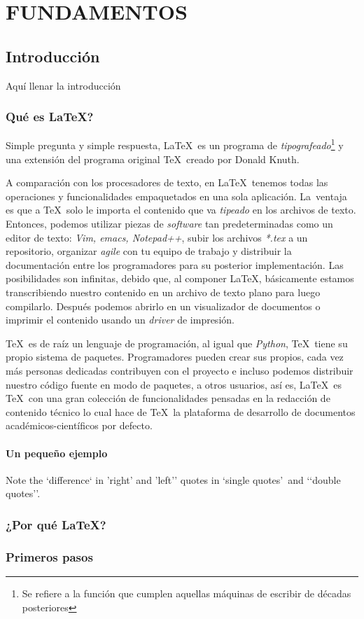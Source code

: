 \documentclass[11pt,a4paper]{book}
\begin{document}
    \tableofcontents

	\part[Fundamentos]{FUNDAMENTOS}

		\chapter{Introducción}\label{ch:intro}
			Aquí llenar la introducción
			\section{Qué es \LaTeX?}\label{sec:what-is-latex}
				\noindent Simple pregunta y simple respuesta, \LaTeX\ es un programa de \emph{tipografeado}\footnote{Se refiere a la función que cumplen aquellas máquinas de escribir de décadas posteriores} y una extensión del programa original \TeX\ creado por Donald Knuth.

				A comparación con los procesadores de texto, en \LaTeX\ tenemos todas las operaciones y funcionalidades empaquetados en una sola aplicación.
				\mbox{La ventaja} es que a \TeX\ solo le importa el contenido que va \emph{tipeado} en los archivos de texto.
				Entonces, podemos utilizar piezas de \emph{software} tan predeterminadas como un editor de texto: \emph{Vim, emacs, Notepad++}, subir los archivos \emph{*.tex} a un repositorio, organizar \emph{agile} con tu equipo de trabajo y distribuir la documentación entre los programadores para su posterior implementación.
				Las posibilidades son infinitas, debido que, al componer \LaTeX, básicamente estamos transcribiendo nuestro contenido en un archivo de texto plano para luego compilarlo.
				Después podemos abrirlo en un visualizador de documentos o imprimir el contenido usando un \emph{driver} de impresión.

				\TeX\ es de raíz un lenguaje de programación, al igual que \emph{Python}, \TeX\ tiene su propio sistema de paquetes.
				Programadores pueden crear sus propios, cada vez más personas dedicadas contribuyen con el proyecto e incluso podemos distribuir nuestro código fuente en modo de paquetes, a otros usuarios, así es, \LaTeX\ es \TeX\ con una gran colección de funcionalidades pensadas en la redacción de contenido técnico lo cual hace de \TeX\ la plataforma de desarrollo de documentos académicos-científicos por defecto.

				\subsection{Un pequeño ejemplo}\label{subsec:little-example}
					Note the `difference` in 'right' and 'left'' quotes in \lq single quotes\rq\ and \lq\lq double quotes\rq\rq.
					\indent

			\section{¿Por qué \LaTeX?}\label{subsec:¿por-qué-latex?}

		\section{Primeros pasos}\label{sec:first-steps}
\end{document}
